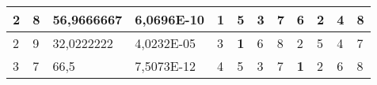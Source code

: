 \documentclass[conference]{IEEEtran}
\begin{document}
\begin{table*}[]
\begin{tabular}{|llll|llllllll|}
\multicolumn{1}{|l|}{2}                                                     & \multicolumn{1}{l|}{8}                                                        & \multicolumn{1}{l|}{56,9666667}                                                   & 6,0696E-10                     & \multicolumn{1}{l|}{\textbf{1}}                                         & \multicolumn{1}{l|}{5}                                                  & \multicolumn{1}{l|}{3}                                                  & \multicolumn{1}{l|}{7}                                                  & \multicolumn{1}{l|}{6}                                                  & \multicolumn{1}{l|}{2}                                                  & \multicolumn{1}{l|}{4}                                                  & 8                          \\ \hline
\multicolumn{1}{|l|}{2}                                                     & \multicolumn{1}{l|}{9}                                                        & \multicolumn{1}{l|}{32,0222222}                                                   & 4,0232E-05                     & \multicolumn{1}{l|}{3}                                                  & \multicolumn{1}{l|}{\textbf{1}}                                         & \multicolumn{1}{l|}{6}                                                  & \multicolumn{1}{l|}{8}                                                  & \multicolumn{1}{l|}{2}                                                  & \multicolumn{1}{l|}{5}                                                  & \multicolumn{1}{l|}{4}                                                  & 7                          \\ \hline
\multicolumn{1}{|l|}{3}                                                     & \multicolumn{1}{l|}{7}                                                        & \multicolumn{1}{l|}{66,5}                                                         & 7,5073E-12                     & \multicolumn{1}{l|}{4}                                                  & \multicolumn{1}{l|}{5}                                                  & \multicolumn{1}{l|}{3}                                                  & \multicolumn{1}{l|}{7}                                                  & \multicolumn{1}{l|}{\textbf{1}}                                         & \multicolumn{1}{l|}{2}                                                  & \multicolumn{1}{l|}{6}                                                  & 8                          \\ \hline

\end{tabular}
\end{table*}
\end{document}
